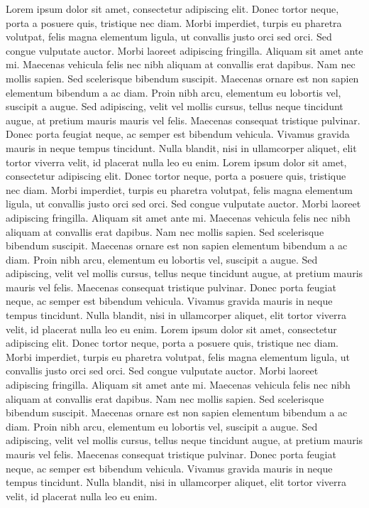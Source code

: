 \documentclass[a4paper,12pt,oneside]{report}
\begin{document}
Lorem ipsum dolor sit amet, consectetur adipiscing elit. Donec tortor neque, porta a posuere quis, tristique nec diam. Morbi imperdiet, turpis eu pharetra volutpat, felis magna elementum ligula, ut convallis justo orci sed orci. Sed congue vulputate auctor. Morbi laoreet adipiscing fringilla. Aliquam sit amet ante mi. Maecenas vehicula felis nec nibh aliquam at convallis erat dapibus. Nam nec mollis sapien. Sed scelerisque bibendum suscipit. Maecenas ornare est non sapien elementum bibendum a ac diam. Proin nibh arcu, elementum eu lobortis vel, suscipit a augue. Sed adipiscing, velit vel mollis cursus, tellus neque tincidunt augue, at pretium mauris mauris vel felis. Maecenas consequat tristique pulvinar. Donec porta feugiat neque, ac semper est bibendum vehicula. Vivamus gravida mauris in neque tempus tincidunt. Nulla blandit, nisi in ullamcorper aliquet, elit tortor viverra velit, id placerat nulla leo eu enim.
Lorem ipsum dolor sit amet, consectetur adipiscing elit. Donec tortor neque, porta a posuere quis, tristique nec diam. Morbi imperdiet, turpis eu pharetra volutpat, felis magna elementum ligula, ut convallis justo orci sed orci. Sed congue vulputate auctor. Morbi laoreet adipiscing fringilla. Aliquam sit amet ante mi. Maecenas vehicula felis nec nibh aliquam at convallis erat dapibus. Nam nec mollis sapien. Sed scelerisque bibendum suscipit. Maecenas ornare est non sapien elementum bibendum a ac diam. Proin nibh arcu, elementum eu lobortis vel, suscipit a augue. Sed adipiscing, velit vel mollis cursus, tellus neque tincidunt augue, at pretium mauris mauris vel felis. Maecenas consequat tristique pulvinar. Donec porta feugiat neque, ac semper est bibendum vehicula. Vivamus gravida mauris in neque tempus tincidunt. Nulla blandit, nisi in ullamcorper aliquet, elit tortor viverra velit, id placerat nulla leo eu enim.
Lorem ipsum dolor sit amet, consectetur adipiscing elit. Donec tortor neque, porta a posuere quis, tristique nec diam. Morbi imperdiet, turpis eu pharetra volutpat, felis magna elementum ligula, ut convallis justo orci sed orci. Sed congue vulputate auctor. Morbi laoreet adipiscing fringilla. Aliquam sit amet ante mi. Maecenas vehicula felis nec nibh aliquam at convallis erat dapibus. Nam nec mollis sapien. Sed scelerisque bibendum suscipit. Maecenas ornare est non sapien elementum bibendum a ac diam. Proin nibh arcu, elementum eu lobortis vel, suscipit a augue. Sed adipiscing, velit vel mollis cursus, tellus neque tincidunt augue, at pretium mauris mauris vel felis. Maecenas consequat tristique pulvinar. Donec porta feugiat neque, ac semper est bibendum vehicula. Vivamus gravida mauris in neque tempus tincidunt. Nulla blandit, nisi in ullamcorper aliquet, elit tortor viverra velit, id placerat nulla leo eu enim.
\end{document}
